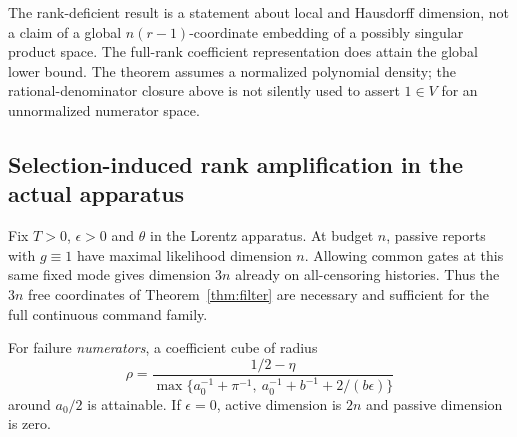 The rank-deficient result is a statement about local and Hausdorff dimension, not a claim of a global $n(r-1)$-coordinate embedding of a possibly singular product space. The full-rank coefficient representation does attain the global lower bound. The theorem assumes a normalized polynomial density; the rational-denominator closure above is not silently used to assert $1\in V$ for an unnormalized numerator space.

\subsection{Selection-induced rank amplification in the actual apparatus}
\begin{theorem}\label{thm:amplification}
Fix $T>0$, $\epsilon>0$ and $\theta$ in the Lorentz apparatus. At budget $n$, passive reports with $g\equiv1$ have maximal likelihood dimension $n$. Allowing common gates at this same fixed mode gives dimension $3n$ already on all-censoring histories. Thus the $3n$ free coordinates of Theorem~\ref{thm:filter} are necessary and sufficient for the full continuous command family.

For failure \emph{numerators}, a coefficient cube of radius
\begin{equation}
 \rho=\frac{1/2-\eta}{\max\{a_0^{-1}+\pi^{-1},\ a_0^{-1}+b^{-1}+2/(b\epsilon)\}}
 \label{eq:lorentz-inball}
\end{equation}
around $a_0/2$ is attainable. If $\epsilon=0$, active dimension is $2n$ and passive dimension is zero.
\end{theorem}
